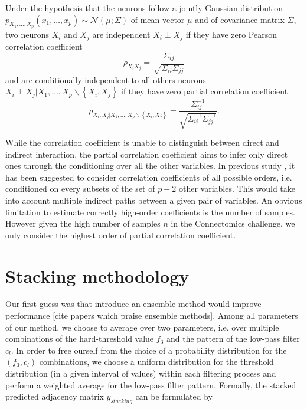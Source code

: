 \documentclass[wcp]{jmlr}
\begin{document}
Under the hypothesis that the neurons follow a jointly Gaussian distribution
$p_{X_1,\ldots,X_p}(x_1,\ldots,x_p) \sim \mathcal{N}(\mu; \Sigma)$
of mean vector $\mu$ and of covariance matrix $\Sigma$, two neurons $X_i$
and $X_j$ are independent $X_i \perp X_j$ if they have zero Pearson correlation
coefficient
\[
\rho_{X_iX_j} = \frac{\Sigma_{ij}}{\sqrt{\Sigma_{ii} \Sigma_{jj}}}
\]
and are conditionally independent to all others neurons
$X_i \perp X_j | X_1,\ldots,X_p \backslash \left\{X_i, X_j\right\}$ if they
have zero partial correlation coefficient
\[
\rho_{X_i, X_j | X_1,\ldots,X_p \backslash \left\{X_i, X_j\right\}} =
\frac{\Sigma^{-1}_{ij}}{\sqrt{\Sigma^{-1}_{ii} \Sigma^{-1}_{jj}}}.
\]

While the correlation coefficient is unable to distinguish between
direct and indirect interaction, the partial correlation coefficient
aims to infer only direct ones through the conditioning over all the other
variables. In previous study \cite{shipley2002cause}, it has been suggested to
consider correlation coefficients of all possible orders,
i.e. conditioned on every subsets of the set of $p-2$ other variables. This
would take into account multiple indirect paths between a given pair of
variables. An obvious limitation to estimate correctly high-order coefficients
is the number of samples. However given the high number of samples $n$
in the Connectomics challenge, we only consider the highest order of partial
correlation coefficient.




\section{Stacking methodology}
\label{sec:stacking}

Our first guess was that introduce an ensemble method would improve performance
[cite papers which praise ensemble methods]. Among all parameters of our method,
we choose to average over two parameters, i.e. over multiple combinations of the
hard-threshold value $f_3$ and the pattern of the low-pass filter $c_l$. In order to
free ourself from the choice of a probability distribution for the $(f_3,c_l)$ combinations,
we choose a uniform distribution for the threshold distribution (in a given interval of
values) within each filtering process and perform a weighted average for the low-pass
filter pattern. Formally, the stacked predicted adjacency matrix $y_{stacking}$ can be formulated by
\end{document}
